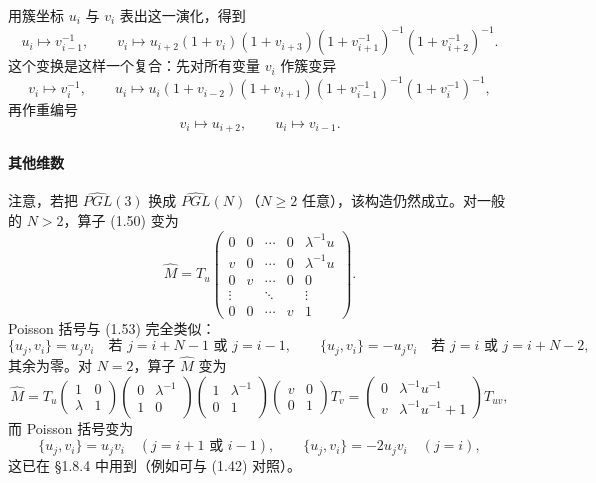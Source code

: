用簇坐标 $u_i$ 与 $v_i$ 表出这一演化，得到
\begin{equation}
u_i\mapsto v_{i-1}^{-1},\qquad
v_i\mapsto u_{i+2}(1+v_i)(1+v_{i+3})(1+v_{i+1}^{-1})^{-1}(1+v_{i+2}^{-1})^{-1}.
\tag{1.56}\label{eq:1.56}
\end{equation}
这个变换是这样一个复合：先对所有变量 $v_i$ 作簇变异
\[
v_i\mapsto v_i^{-1},\qquad
u_i\mapsto u_i(1+v_{i-2})(1+v_{i+1})(1+v_{i-1}^{-1})^{-1}(1+v_i^{-1})^{-1},
\]
再作重编号
\[
v_i\mapsto u_{i+2},\qquad u_i\mapsto v_{i-1}.
\]

\paragraph{其他维数}
注意，若把 $\widehat{PGL}(3)$ 换成 $\widehat{PGL}(N)$（$N\geqslant2$ 任意），该构造仍然成立。对一般的 $N>2$，算子 (1.50) 变为
\[
\hat M=T_u\begin{pmatrix}
0&0&\cdots&0&\lambda^{-1}u\\
v&0&\cdots&0&\lambda^{-1}u\\
0&v&\cdots&0&0\\
\vdots& &\ddots& &\vdots\\
0&0&\cdots&v&1
\end{pmatrix}.
\]
Poisson 括号与 (1.53) 完全类似：
\[
\{u_j,v_i\}=u_jv_i\quad\text{若 } j=i+N-1 \text{ 或 } j=i-1,\qquad
\{u_j,v_i\}=-u_jv_i\quad\text{若 } j=i \text{ 或 } j=i+N-2,
\]
其余为零。对 $N=2$，算子 $\hat M$ 变为
\[
\hat M=T_u\begin{pmatrix}1&0\\ \lambda&1\end{pmatrix}
\begin{pmatrix}0&\lambda^{-1}\\1&0\end{pmatrix}
\begin{pmatrix}1&\lambda^{-1}\\0&1\end{pmatrix}
\begin{pmatrix}v&0\\0&1\end{pmatrix}T_v
=\begin{pmatrix}0&\lambda^{-1}u^{-1}\\ v&\lambda^{-1}u^{-1}+1\end{pmatrix}T_{uv},
\]
而 Poisson 括号变为
\[
\{u_j,v_i\}=u_jv_i\quad(j=i+1 \text{ 或 } i-1),\qquad
\{u_j,v_i\}=-2u_jv_i\quad(j=i),
\]
这已在 §1.8.4 中用到（例如可与 (1.42) 对照）。
